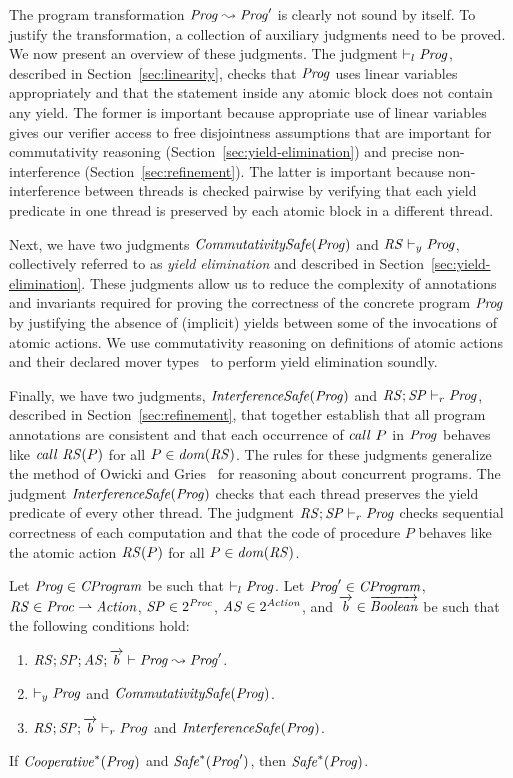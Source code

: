 The program transformation $\mathit{Prog} \leadsto \mathit{Prog}'$ is clearly not sound by itself.
To justify the transformation, a collection of auxiliary judgments need to be proved.
We now present an overview of these judgments.
The judgment $\vdash_l \mathit{Prog}$, described in Section~\ref{sec:linearity}, 
checks that $\mathit{Prog}$ uses linear variables appropriately and that the statement
inside any atomic block does not contain any yield.
The former is important because appropriate use of linear variables gives our verifier access to free disjointness
assumptions that are important for commutativity reasoning (Section~\ref{sec:yield-elimination})
and precise non-interference (Section~\ref{sec:refinement}).
The latter is important because non-interference between threads is checked pairwise by verifying that each yield predicate
in one thread is preserved by each atomic block in a different thread.

Next, we have two judgments $\mathit{CommutativitySafe}(\mathit{Prog})$ and $\mathit{RS} \vdash_y \mathit{Prog}$, collectively 
referred to as {\em yield elimination\/} and described in Section~\ref{sec:yield-elimination}.
These judgments allow us to reduce the complexity of annotations and invariants 
required for proving the correctness of the concrete program $\mathit{Prog}$
by justifying the absence of (implicit) yields between some of the 
invocations of atomic actions.
We use commutativity reasoning on definitions of atomic actions and their declared mover types~\cite{FlanaganFLQ08,ElmasQT09}
to perform yield elimination soundly.

Finally, we have two judgments, $\mathit{InterferenceSafe}(\mathit{Prog})$ and $\mathit{RS};\mathit{SP} \vdash_r \mathit{Prog}$,
described in Section~\ref{sec:refinement},
that together establish that all program annotations are consistent and that 
each occurrence of $\mathit{call}\ P$ in $\mathit{Prog}$ behaves like $\mathit{call}\ \mathit{RS}(P)$ 
for all $P \in \mathit{dom}(\mathit{RS})$.
The rules for these judgments generalize the method of Owicki and Gries~\cite{OwickiG76} for reasoning about concurrent programs.
The judgment $\mathit{InterferenceSafe}(\mathit{Prog})$ checks that each thread preserves the
yield predicate of every other thread.
The judgment $\mathit{RS};\mathit{SP} \vdash_r \mathit{Prog}$ checks sequential correctness of each computation
and that the code of procedure $P$ behaves like the atomic action $\mathit{RS}(P)$ for all $P\in\mathit{dom}(\mathit{RS})$.

\begin{theorem}
\label{thm:correctness}
Let $\mathit{Prog} \in \mathit{CProgram}$ be such that $\vdash_l \mathit{Prog}$.
Let $\mathit{Prog}' \in \mathit{CProgram}$, $\mathit{RS} \in \mathit{Proc} \rightharpoonup \mathit{Action}$, $\mathit{SP} \in 2^{\mathit{Proc}}$, $\mathit{AS} \in 2^{\mathit{Action}}$,
and $\overrightarrow{b} \in \overrightarrow{\mathit{Boolean}}$ be such that the following conditions hold:
\begin{enumerate}
\item
$\mathit{RS};\mathit{SP};\mathit{AS};\overrightarrow{b} \vdash \mathit{Prog} \leadsto \mathit{Prog}'$.
\item
$\vdash_y \mathit{Prog}$ and $\mathit{CommutativitySafe}(\mathit{Prog})$.
\item
$\mathit{RS};\mathit{SP};\overrightarrow{b} \vdash_r \mathit{Prog}$ and $\mathit{InterferenceSafe}(\mathit{Prog})$.
\end{enumerate}
If $\mathit{Cooperative}^*(\mathit{Prog})$ and $\mathit{Safe}^*(\mathit{Prog}')$, then $\mathit{Safe}^*(\mathit{Prog})$.
\end{theorem}

